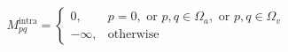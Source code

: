\begin{equation}
\label{eq:intra-mask}
{M}_{pq}^{\mathrm{intra}}=\left\{ \begin{array}{ll}0,&p=0,\text{ or }p,q\in {\Omega }_{a},\text{ or }p,q\in {\Omega }_{v}\\-\infty ,&\text{otherwise}\end{array}\right . 
\end{equation}

